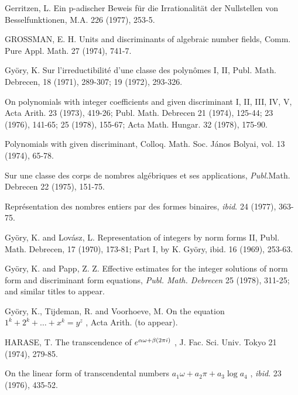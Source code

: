 \begin{hanglist}
    \item Gerritzen, L. Ein p-adischer Beweis für die Irrationalität der Nullstellen von Besselfunktionen, M.A. 226 (1977), 253-5.
    \item GROSSMAN, E. H. Units and discriminants of algebraic number fields, Comm. Pure Appl. Math. 27 (1974), 741-7.
    \item Györy, K. Sur l'irreductibilité d'une classe des polynômes I, II, Publ. Math. Debrecen, 18 (1971), 289-307; 19 (1972), 293-326.
    \item \hspace{1.5em} On polynomials with integer coefficients and given discriminant I, II, III, IV, V, Acta Arith. 23 (1973), 419-26; Publ. Math. Debrecen 21 (1974), 125-44; 23 (1976), 141-65; 25 (1978), 155-67; Acta Math. Hungar. 32 (1978), 175-90.
    \item \hspace{1.5em} Polynomials with given discriminant, Colloq. Math. Soc. János Bolyai, vol. 13 (1974), 65-78.
    \item \hspace{1.5em} Sur une classe des corps de nombres algébriques et ses applications, \textit{Publ.}Math. Debrecen 22 (1975), 151-75.
    \item \hspace{1.5em} Représentation des nombres entiers par des formes binaires, \textit{ibid}. 24 (1977), 363-75.
    \item Györy, K. and Lovász, L. Representation of integers by norm forms II, Publ. Math. Debrecen, 17 (1970), 173-81; Part I, by K. Györy, ibid. 16 (1969), 253-63.
    \item Györy, K. and Papp, Z. Z. Effective estimates for the integer solutions of norm form and discriminant form equations, \textit{Publ. Math. Debrecen} 25 (1978), 311-25; and similar titles to appear.
    \item Györy, K., Tijdeman, R. and Voorhoeve, M. On the equation  $1^k + 2^k + \dots + x^k = y^z$ , Acta Arith. (to appear).
    \item HARASE, T. The transcendence of  $e\index{transcendence of e}^{\alpha\omega+\beta(2\pi i)}$ , J. Fac. Sci. Univ. Tokyo 21 (1974), 279-85.
    \item \hspace{1.5em} On the linear form of transcendental numbers  $a_1\omega + a_2\pi + a_3 \log a_4$ , \textit{ibid}. 23 (1976), 435-52.

\end{hanglist}
